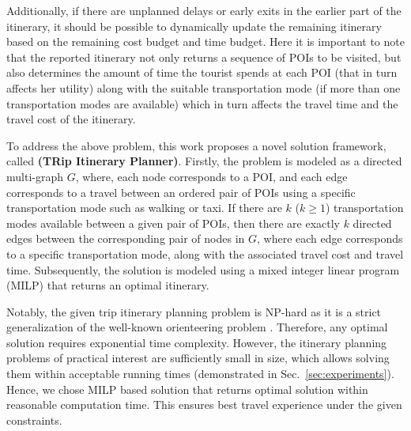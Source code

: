Additionally, if there are unplanned delays or early exits in the earlier part of the itinerary, it should be possible to dynamically update the remaining itinerary based on the remaining cost budget and time budget. Here it is important to note that the reported itinerary not only returns a sequence of POIs to be visited, but also determines the amount of time the tourist spends at each POI (that in turn affects her utility) along with the suitable transportation mode (if more than one transportation modes are available) which in turn affects the travel time and the travel cost of the itinerary.

To address the above problem, this work proposes a novel solution framework,  called \textbf{\trip (TRip Itinerary Planner)}.  Firstly, the problem is modeled as a directed multi-graph $G$, where, each node corresponds to a POI, and each edge corresponds to a travel between an ordered pair of POIs using a specific transportation mode such as walking or taxi. If there are $k$ ($k \ge 1$) transportation modes available between a given pair of POIs, then there are exactly $k$ directed edges between the corresponding pair of nodes in $G$, where each edge corresponds to a specific transportation mode, along with the associated travel cost and travel time. Subsequently, the solution is modeled using a mixed integer linear program (MILP) that returns an optimal itinerary. 

Notably, the given trip itinerary planning problem is NP-hard as it is a strict generalization of the well-known orienteering problem \cite{vansteenwegen2011orienteering, gunawan2016orienteering, vansteenwegen2019orienteering}. Therefore, any optimal solution requires exponential time complexity. However, the itinerary planning problems of practical interest are sufficiently small in size, which allows solving them within acceptable running times (demonstrated in Sec.~\ref{sec:experiments}). Hence, we chose MILP based solution that returns optimal solution within reasonable computation time. This ensures best travel experience under the given constraints.

